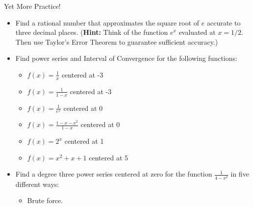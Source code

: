 \begin{exercise}{Yet More Practice! \Coffeecup \Coffeecup \Coffeecup}
\begin{itemize}

\item Find a rational number that approximates the square root of $e$ accurate to three decimal places.  ({\bf Hint:} Think of the function $e^{x}$ evaluated at $x={1/2}$.  Then use Taylor's Error Theorem to guarantee sufficient accuracy.)
\vspace*{3in}

\item Find power series and Interval of Convergence for the following functions:

\begin{itemize} \item $f(x)=\frac{1}{x}$ centered at -3

\vspace*{1in}

\item $f(x)=\frac{1}{1-x}$ centered at -3

\vspace*{1in}

\item $f(x)=\frac{1}{e^x}$ centered at 0

\vspace*{1in}

\item $f(x)=\frac{1-x-x^2}{1-x}$ centered at 0

\vspace*{1in}

\item $f(x)=2^x$ centered at 1

\vspace*{1in}

\item $f(x)=x^2+x+1 $ centered at 5

\vspace*{1in}

\end{itemize}

\item  Find a degree three power series centered at zero for the function $\frac{1}{4-x^2}$ in five different ways:
 \begin{itemize}
\item Brute force.


\end{itemize}
\end{itemize}
\end{exercise}

